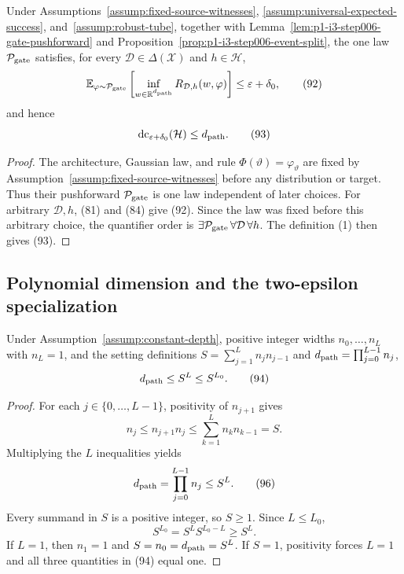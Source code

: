 \begin{proposition}
\label{prop:p1-i3-step006-dc-witness}
Under Assumptions~\ref{assump:fixed-source-witnesses},
\ref{assump:universal-expected-success}, and~\ref{assump:robust-tube},
together with Lemma~\ref{lem:p1-i3-step006-gate-pushforward} and
Proposition~\ref{prop:p1-i3-step006-event-split}, the one law
$\mathcal P_{\rm gate}$ satisfies, for every
$\mathcal D\in\Delta(\mathcal X)$ and $h\in\mathcal H$,
\[
\mathbb E_{\varphi\sim\mathcal P_{\rm gate}}
\left[\inf_{w\in\mathbb R^{d_{\rm path}}}
R_{\mathcal D,h}(w,\varphi)\right]\leq\varepsilon+\delta_0,
\tag{92}
\]
and hence
\[
\operatorname{dc}_{\varepsilon+\delta_0}(\mathcal H)
\leq d_{\rm path}.
\tag{93}
\]
\end{proposition}

\begin{proof}
The architecture, Gaussian law, and rule $\Phi(\vartheta)=\varphi_\vartheta$
are fixed by Assumption~\ref{assump:fixed-source-witnesses} before any
distribution or target.  Thus their pushforward $\mathcal P_{\rm gate}$ is
one law independent of later choices.  For arbitrary $\mathcal D,h$, (81)
and (84) give (92).  Since the law was fixed before this arbitrary choice, the
quantifier order is $\exists\mathcal P_{\rm gate}\,\forall\mathcal D\,\forall h$.
The definition (1) then gives (93).
\end{proof}

\subsection{Polynomial dimension and the two-epsilon specialization}
\label{app:step007-specialization}

\begin{lemma}
\label{lem:p1-i3-step007-path-count}
Under Assumption~\ref{assump:constant-depth}, positive integer widths
$n_0,\ldots,n_L$ with $n_L=1$, and the setting definitions
$S=\sum_{j=1}^{L}n_jn_{j-1}$ and
$d_{\rm path}=\prod_{j=0}^{L-1}n_j$,
\[
d_{\rm path}\leq S^L\leq S^{L_0}.
\tag{94}
\]
\end{lemma}

\begin{proof}
For each $j\in\{0,\ldots,L-1\}$, positivity of $n_{j+1}$ gives
\[
n_j\leq n_{j+1}n_j\leq\sum_{k=1}^{L}n_kn_{k-1}=S.
\tag{95}
\]
Multiplying the $L$ inequalities yields
\[
d_{\rm path}=\prod_{j=0}^{L-1}n_j\leq S^L.
\tag{96}
\]
Every summand in $S$ is a positive integer, so $S\geq1$.  Since
$L\leq L_0$,
\[
S^{L_0}=S^LS^{L_0-L}\geq S^L.
\tag{97}
\]
If $L=1$, then $n_1=1$ and $S=n_0=d_{\rm path}=S^L$.  If $S=1$, positivity
forces $L=1$ and all three quantities in (94) equal one.
\end{proof}

